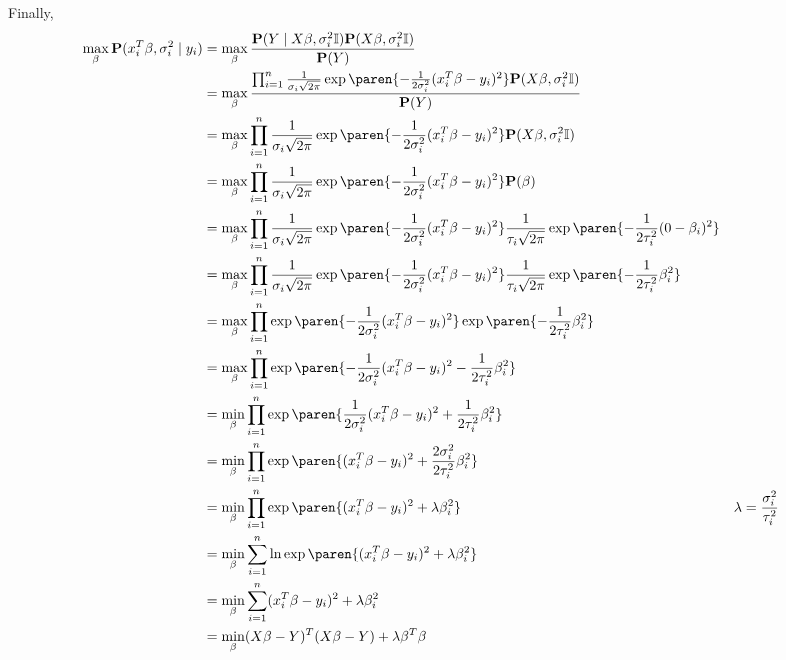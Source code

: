 \documentclass{homework}
\renewcommand\P{\mathbf{P}}
\begin{document}
Finally,
\begin{align*}
  \max_\beta \P(x_{i}^{T}\beta, \sigma^2_i\mid y_i) &= \max_\beta \frac{\P(Y \mid X\beta, \sigma^2_i\mathbb{I})\P(X\beta, \sigma^2_i\mathbb{I})}{\P(Y)} \\
        &= \max_\beta \frac{\prod_{i=1}^{n} \frac{1}{\sigma_i\sqrt{2\pi}}\exp\paren{-\frac{1}{2\sigma_i^2}(x_{i}^{T}\beta - y_i)^2}\P(X\beta, \sigma^2_i\mathbb{I})}{\P(Y)} \\
        &= \max_\beta \prod_{i=1}^{n} \frac{1}{\sigma_i\sqrt{2\pi}}\exp\paren{-\frac{1}{2\sigma_i^2}(x_{i}^{T}\beta - y_i)^2}\P(X\beta, \sigma^2_i\mathbb{I}) \\
        &= \max_\beta \prod_{i=1}^{n} \frac{1}{\sigma_i\sqrt{2\pi}}\exp\paren{-\frac{1}{2\sigma_i^2}(x_{i}^{T}\beta - y_i)^2}\P(\beta) \\
        &= \max_\beta \prod_{i=1}^{n} \frac{1}{\sigma_i\sqrt{2\pi}}\exp\paren{-\frac{1}{2\sigma_i^2}(x_{i}^{T}\beta - y_i)^2}\frac{1}{\tau_i\sqrt{2\pi}}\exp\paren{-\frac{1}{2\tau_i^2}(0 - \beta_i)^2} \\
        &= \max_\beta \prod_{i=1}^{n} \frac{1}{\sigma_i\sqrt{2\pi}}\exp\paren{-\frac{1}{2\sigma_i^2}(x_{i}^{T}\beta - y_i)^2}\frac{1}{\tau_i\sqrt{2\pi}}\exp\paren{-\frac{1}{2\tau_i^2}\beta_i^2} \\
        &= \max_\beta \prod_{i=1}^{n} \exp\paren{-\frac{1}{2\sigma_i^2}(x_{i}^{T}\beta - y_i)^2}\exp\paren{-\frac{1}{2\tau_i^2}\beta_i^2} \\
        &= \max_\beta \prod_{i=1}^{n} \exp\paren{-\frac{1}{2\sigma_i^2}(x_{i}^{T}\beta - y_i)^2-\frac{1}{2\tau_i^2}\beta_i^2} \\
        &= \min_\beta \prod_{i=1}^{n} \exp\paren{\frac{1}{2\sigma_i^2}(x_{i}^{T}\beta - y_i)^2+\frac{1}{2\tau_i^2}\beta_i^2} \\
        &= \min_\beta \prod_{i=1}^{n} \exp\paren{(x_{i}^{T}\beta - y_i)^2+\frac{2\sigma_i^2}{2\tau_i^2}\beta_i^2} \\
        &= \min_\beta \prod_{i=1}^{n} \exp\paren{(x_{i}^{T}\beta - y_i)^2+\lambda\beta_i^2} && \lambda = \frac{\sigma_i^2}{\tau_i^2} \\
        &= \min_\beta \sum_{i=1}^{n} \ln\exp\paren{(x_{i}^{T}\beta - y_i)^2+\lambda\beta_i^2} \\
        &= \min_\beta \sum_{i=1}^{n} (x_{i}^{T}\beta - y_i)^2+\lambda\beta_i^2 \\
        &= \min_\beta (X\beta - Y)^T(X\beta - Y)+\lambda\beta^T\beta \\
\end{align*}
\end{document}
